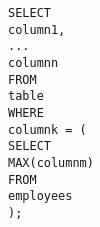 \documentclass[10pt, english]{article}
\begin{document}
\texttt{SELECT \\
\hspace*{10pt} column1, \\
... \\
\hspace*{10pt} columnn \\
FROM \\
\hspace*{10pt} table \\
WHERE \\
\hspace*{10pt} columnk = (\\
\hspace*{10pt} \hspace*{10pt} SELECT \\
\hspace*{10pt} \hspace*{10pt} \hspace*{10pt} MAX(columnm) \\
\hspace*{10pt} \hspace*{10pt} FROM \\
\hspace*{10pt} \hspace*{10pt} \hspace*{10pt} employees \\ 
);}
\end{document}
